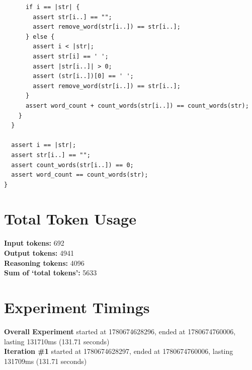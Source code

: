 \documentclass{article}
\begin{document}
\begin{lstlisting}
      if i == |str| {
        assert str[i..] == "";
        assert remove_word(str[i..]) == str[i..];
      } else {
        assert i < |str|;
        assert str[i] == ' ';
        assert |str[i..]| > 0;
        assert (str[i..])[0] == ' ';
        assert remove_word(str[i..]) == str[i..];
      }
      assert word_count + count_words(str[i..]) == count_words(str);
    }
  }

  assert i == |str|;
  assert str[i..] == "";
  assert count_words(str[i..]) == 0;
  assert word_count == count_words(str);
}
\end{lstlisting}
\section*{Total Token Usage}
\textbf{Input tokens: }692
\\\textbf{Output tokens: }4941
\\\textbf{Reasoning tokens: }4096
\\\textbf{Sum of `total tokens': }5633
\section*{Experiment Timings}
\textbf{Overall Experiment} started at 1780674628296, ended at 1780674760006, lasting 131710ms (131.71 seconds)
\\\textbf{Iteration \#1} started at 1780674628297, ended at 1780674760006, lasting 131709ms (131.71 seconds)
\end{document}
